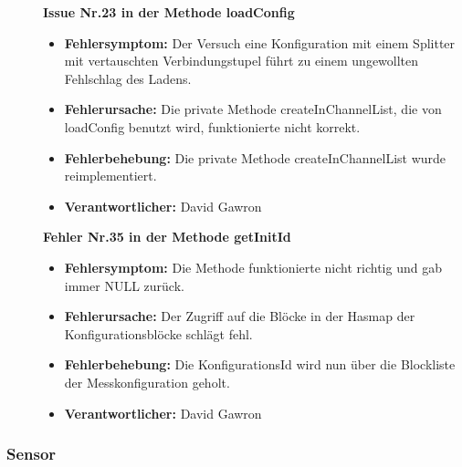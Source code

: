 \documentclass[parskip=full]{scrartcl}
\begin{document}
\begin{description}
\item []\textbf{Issue Nr.23 in der Methode loadConfig} 

\begin{itemize}
\item []\textbf{Fehlersymptom:} Der Versuch eine Konfiguration mit einem Splitter mit vertauschten Verbindungstupel führt zu einem ungewollten Fehlschlag des Ladens.
\item []\textbf{Fehlerursache:} Die private Methode createInChannelList, die von loadConfig benutzt wird, funktionierte nicht korrekt.
\item []\textbf{Fehlerbehebung:} Die private Methode createInChannelList wurde reimplementiert.
\item []\textbf{Verantwortlicher:} David Gawron
\end{itemize}


\item []\textbf{Fehler Nr.35 in der Methode getInitId} 

\begin{itemize}
\item []\textbf{Fehlersymptom:} Die Methode funktionierte nicht richtig und gab immer NULL zurück.
\item []\textbf{Fehlerursache:} Der Zugriff auf die Blöcke in der Hasmap der Konfigurationsblöcke schlägt fehl.
\item []\textbf{Fehlerbehebung:} Die KonfigurationsId wird nun über die Blockliste der Messkonfiguration geholt.
\item []\textbf{Verantwortlicher:} David Gawron
\end{itemize}

\end{description}

\subsubsection{Sensor}
\end{document}
